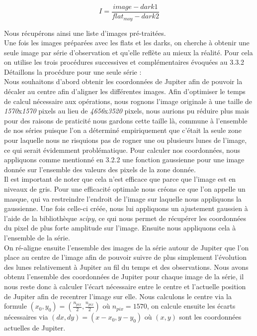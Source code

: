 \documentclass{aa}
\begin{document}
\begin{equation}
    I = \frac{image - dark1}{flat_{moy} - dark2 }
\end{equation}

Nous récupérons ainsi une liste d'images pré-traitées. \\
Une fois les images préparées avec les flats et les darks, on cherche à obtenir une seule image par série d'observation et qu'elle reflète au mieux la réalité. Pour cela on utilise les trois procédures successives et complémentaires évoquées au 3.3.2 \\

Détaillons la procédure pour une seule série : \\
Nous souhaitons d'abord obtenir les coordonnées de Jupiter afin de pouvoir la décaler au centre afin d'aligner les différentes images. Afin d'optimiser le temps de calcul nécessaire aux opérations, nous rognons l'image originale à une taille de \textit{1570}x\textit{1570} pixels au lieu de \textit{4656}x\textit{3520} pixels, nous aurions pu réduire plus mais pour des raisons de praticité nous gardons cette taille là, commune à l'ensemble de nos séries puisque l'on a déterminé empiriquement que c'était la seule zone pour laquelle nous ne risquions pas de rogner une ou plusieurs lunes de l'image, ce qui serait évidemment problématique. Pour calculer nos coordonnées, nous appliquons comme mentionné en 3.2.2 une fonction gaussienne pour une image donnée sur l'ensemble des valeurs des pixels de la zone donnée. \\

Il est important de noter que cela n'est efficace que parce que l'image est en niveaux de gris. Pour une efficacité optimale nous créons ce que l'on appelle un masque, qui va restreindre l'endroit de l'image sur laquelle nous appliquons la gaussienne. Une fois celle-ci créée, nous lui appliquons un ajustement gaussien à l'aide de la bibliothèque \emph{scipy}, ce qui nous permet de récupérer les coordonnées du pixel de plus forte amplitude sur l'image. Ensuite nous appliquons cela à l'ensemble de la série. \\

On ré-aligne ensuite l'ensemble des images de la série autour de Jupiter que l'on place au centre de l'image afin de pouvoir suivre de plus simplement l'évolution des lunes relativement à Jupiter au fil du temps et des observations. Nous avons obtenu l'ensemble des coordonnées de Jupiter pour chaque image de la série, il  nous reste donc à calculer l'écart nécessaire entre le centre et l'actuelle position de Jupiter afin de recentrer l'image sur elle. Nous calculons le centre via la formule $(x_0,y_0) = (\frac{n_{pix}}{2} , \frac{n_{pix}}{2})$ où $n_{pix} = 1570$, on calcule ensuite les écarts nécessaires via $(dx,dy) = (x-x_0 ,y-y_0)$ où $(x,y)$ sont les coordonnées actuelles de Jupiter.\\
\end{document}

